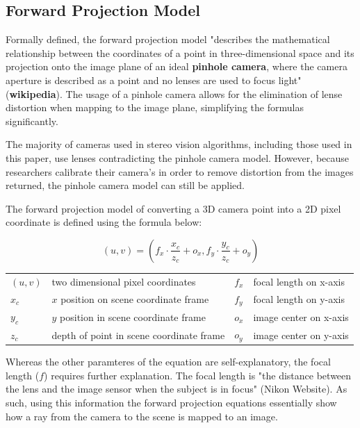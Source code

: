 \documentclass[11pt]{scrartcl}
\begin{document}
\subsection{Forward Projection Model}

Formally defined, the forward projection model "describes the mathematical relationship
between the coordinates of a point in three-dimensional space and its projection onto the image
plane of an ideal \textbf{pinhole camera}, where the camera aperture is described as a point and no lenses
are used to focus light" (\textbf{wikipedia}). The usage of a pinhole camera allows
for the elimination of lense distortion when mapping to the image plane, simplifying
the formulas significantly.

\begin{remark}
  The majority of cameras used in stereo vision algorithms, including those
  used in this paper, use lenses contradicting the pinhole camera model.
  However, because researchers calibrate their camera's in order to remove
  distortion from the images returned, the pinhole camera model can still
  be applied.
\end{remark}
The forward projection model of converting a 3D camera point into a 2D pixel
coordinate is defined using the formula below:
\begin{theorem}

  \begin{displaymath}
    (u, v) = (f_x \cdot \displaystyle\frac{x_c}{z_c} + o_x,
    f_y \cdot \displaystyle\frac{y_c}{z_c} + o_y)
  \end{displaymath}
  \begin{figurekey}
    \begin{tabular}{llll}
      $(u,v)$ & two dimensional pixel coordinates        & $f_x$ & focal length on x-axis \\
      $x_c$   & $x$ position on scene coordinate frame   & $f_y$ & focal length on y-axis \\
      $y_c$   & $y$ position in scene coordinate frame   & $o_x$ & image center on x-axis \\
      $z_c$   & depth of point in scene coordinate frame & $o_y$ & image center on y-axis \\
    \end{tabular}
  \end{figurekey}
\end{theorem}
Whereas the other paramteres of the equation are self-explanatory, the focal
length ($f$) requires further explanation. The focal length is "the distance
between the lens and the image sensor when the subject is in focus" (Nikon Website).
As such, using this information the forward projection equations essentially show how
a ray from the camera to the scene is mapped to an image.
\end{document}
